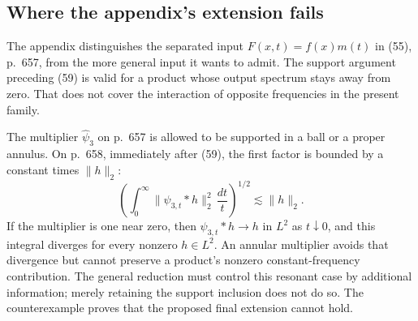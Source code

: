 \documentclass[10pt]{article}
\begin{document}
\subsection*{Where the appendix’s extension fails}
The appendix distinguishes the separated input \(F(x,t)=f(x)m(t)\) in (55), p. 657, from the more general input it wants to admit. The support argument preceding (59) is valid for a product whose output spectrum stays away from zero. That does not cover the interaction of opposite frequencies in the present family.\par
The multiplier \(\widehat\psi_3\) on p. 657 is allowed to be supported in a ball or a proper annulus. On p. 658, immediately after (59), the first factor is bounded by a constant times \(\|h\|_2\): \[\left(\int_0^\infty\|\psi_{3,t}*h\|_2^2\,\frac{dt}{t}\right)^{1/2}
 \lesssim\|h\|_2.\] If the multiplier is one near zero, then \(\psi_{3,t}*h\to h\) in \(L^2\) as \(t\downarrow0\), and this integral diverges for every nonzero \(h\in L^2\). An annular multiplier avoids that divergence but cannot preserve a product’s nonzero constant-frequency contribution. The general reduction must control this resonant case by additional information; merely retaining the support inclusion does not do so. The counterexample proves that the proposed final extension cannot hold.\par
\end{document}
